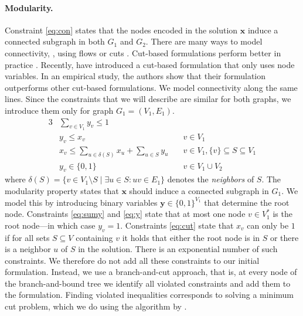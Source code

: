 		\paragraph{Modularity.}
		Constraint \eqref{eq:con} states that the nodes encoded in the solution
		$\mathbf{x}$ induce a connected subgraph in both $G_1$ and $G_2$. There are many ways
		to model connectivity, \eg, using flows or cuts
		\cite{magnanti1995optimal}. Cut-based formulations perform better
		in practice \cite{dilkina2010solving}.
		Recently, \parencite{alvarez2013maximum} have introduced a cut-based formulation
		that only uses node variables. In an empirical study, the authors show that their formulation
		outperforms other cut-based formulations. We model connectivity along
		the same lines.
		Since the constraints that we will describe are similar for both graphs, we
		introduce them only for graph $G_1 = (V_1, E_1)$. 
		\begin{alignat}{3}
		\label{eq:sumy} & \sum_{v \in V_1} y_v \leq 1 & \\
		\label{eq:y}    & y_v \leq x_v & v \in V_1\\
		\label{eq:cut}  & x_v \leq \sum_{u \in \delta(S)} x_u + \sum_{u \in S} y_u
                  		\quad & v \in V_1, \{v\} \subseteq S \subseteq{V_1}\\
		\label{eq:vars3} & y_v \in \{0,1\} & v \in V_1 \cup V_2
		\end{alignat}
		where $\delta(S) = \{ v \in V_1 \setminus S \mid \exists u \in S: uv
		\in E_1 \}$ denotes the \emph{neighbors} of $S$. The modularity property
		states that $\mathbf{x}$ should induce a connected subgraph in
		$G_1$. We model this by introducing binary variables $\mathbf{y} \in
		\{0, 1\}^{V_1}$ that determine the root node. 
		Constraints \eqref{eq:sumy} and \eqref{eq:y} state that at most
		one node $v \in V_1^*$ is the root node---in which
		case $y_v = 1$. 
		Constraints \eqref{eq:cut} state that $x_v$ can only be $1$ if for all sets $S
		\subseteq V$ containing $v$ it holds that either the root node is in $S$ or
		there is a neighbor $u$ of $S$ in the solution. There is an
		exponential number of such constraints. We therefore do not add all
		these constraints to our initial formulation. Instead, we use a
		branch-and-cut approach, that is, at every node of the
		branch-and-bound tree we identify all
		violated constraints and add them to the formulation. Finding violated
		inequalities corresponds to solving a minimum cut problem, which we do using the algorithm
		by \parencite{boykov2004experimental}.

